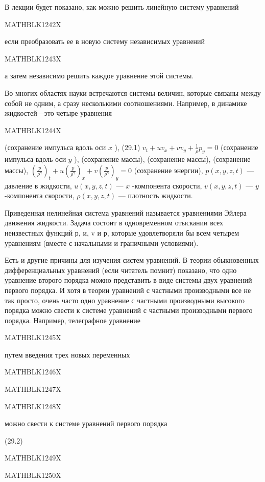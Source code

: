\documentclass[
]{article}
\begin{document}
В лекции будет показано, как можно решить линейную систему уравнений

MATHBLK1242X

если преобразовать ее в новую систему независимых уравнений

MATHBLK1243X

а затем независимо решить каждое уравнение этой системы.

Во многих областях науки встречаются системы величин, которые связаны
между собой не одним, а сразу несколькими соотношениями. Например, в
динамике жидкостей---это четыре уравнения

MATHBLK1244X

(сохранение импульса вдоль оси \(x\) ), (29.1)
\(v_t + uv_x + vv_y + \frac{1}{\rho} p_y = 0\) (сохранение импульса
вдоль оси \(y\) ), (сохранение массы), (сохранение массы), (сохранение
массы),
\(\left(\frac{p}{\rho^{\gamma}}\right)_t + u\left(\frac{p}{\rho^{\gamma}}\right)_x + v\left(\frac{p}{\rho^{\gamma}}\right)_y = 0\)
(сохранение энергии), \(p(x, y, z, t)\) --- давление в жидкости,
\(u(x, y, z, t)\) --- \(x\) -компонента скорости, \(v(x, y, z, t)\) ---
\(y\) -компонента скорости, \(\rho(x, y, z, t)\) --- плотность жидкости.

Приведенная нелинейная система уравнений называется уравнениями Эйлера
движения жидкости. Задача состоит в одновременном отыскании всех
неизвестных функций р, и, v и р, которые удовлетворяли бы всем четырем
уравнениям (вместе с начальными и граничными условиями).

Есть и другие причины для изучения систем уравнений. В теории
обыкновенных дифференциальных уравнений (если читатель помнит) показано,
что одно уравнение второго порядка можно представить в виде системы двух
уравнений первого порядка. И хотя в теории уравнений с частными
производными все не так просто, очень часто одно уравнение с частными
производными высокого порядка можно свести к системе уравнений с
частными производными первого порядка. Например, телеграфное уравнение

MATHBLK1245X

путем введения трех новых переменных

MATHBLK1246X

MATHBLK1247X

MATHBLK1248X

можно свести к системе уравнений первого порядка

(29.2)

MATHBLK1249X

MATHBLK1250X
\end{document}

